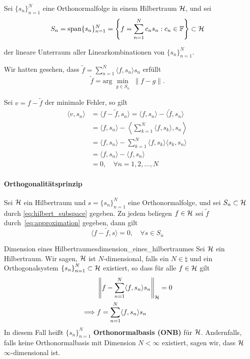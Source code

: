 Sei $\{s_{n}\}_{n=1}^{N}$ eine Orthonormalfolge in einem Hilbertraum $\mathcal{H}$, und sei
\begin{equation}
S_{n} = \mathrm{span}\{s_{n}\}_{n=1}^{N} = \left\{f = \sum\limits_{n=1}^{N} c_{n}s_{n} : c_{n} \in \mathbb{F}\right\} \subset \mathcal{H} \label{eq:hilbert_subspace}
\end{equation}

der lineare Unterraum aller Linearkombinationen von $\{s_{n}\}_{n=1}^{N}$.

Wir hatten gesehen, dass $\tilde{f} = \sum\limits_{n=1}^{N} \langle f, s_{n} \rangle s_{n}$ erfüllt
\begin{equation}
  \tilde{f} = \mathrm{arg}\min_{\substack{g\in S_{n}}} \| f - g \|. \label{eq:approximation}
\end{equation}

Sei $v = f - \tilde{f}$ der minimale Fehler, so gilt
\begin{align*}
  \langle v, s_{n} \rangle &= \langle f - \tilde{f}, s_{n} \rangle =\langle f, s_{n} \rangle - \langle \tilde{f}, s_{n} \rangle\\
  &= \langle f, s_{n} \rangle - \left\langle \sum\limits_{k=1}^{N}\langle f, s_{k} \rangle , s_{n} \right\rangle\\
  &= \langle f, s_{n} \rangle -  \sum\limits_{k=1}^{N}\langle f, s_{k} \rangle  \langle s_{k}, s_{n} \rangle\\
  &= \langle f, s_{n} \rangle - \langle f, s_{n} \rangle\\
  &= 0, \quad \forall n=1,2,\dots,N
\end{align*}

\paragraph{Orthogonalitätsprinzip}
Sei $\mathcal{H}$ ein Hilbertraum und $s = \{s_{n}\}_{n=1}^{N}$ eine Orthonormalfolge, und sei $S_{n} \subset \mathcal{H}$ durch \eqref{eq:hilbert_subspace} gegeben.
Zu jedem beliegen $f \in \mathcal{H}$ sei $\tilde{f}$ durch~\eqref{eq:approximation} gegeben, dann gilt
\begin{equation}
  \langle f - \tilde{f}, s \rangle  = 0, \quad \forall s \in S_{n}
\end{equation}

\begin{boringDef}{Dimension eines Hilbertraumes}{dimension_eines_hilbertraumes}
  Sei $\mathcal{H}$ ein Hilbertraum. Wir sagen, $\mathcal{H}$ ist $N$-dimensional, falls ein $N \in \natural$ und ein Orthogonalsystem ${\{s_{n}\}}_{n=1}^{N} \subset \mathcal{H}$ existiert, so dass für alle $f \in \mathcal{H}$ gilt
  \begin{align}
    &\left\| f - \sum\limits_{n=1}^{N} \langle f, s_{n} \rangle s_{n} \right\|_{\mathcal{H}} = 0\\
    \implies &f = \sum\limits_{n=1}^{N} \langle f, s_{n} \rangle s_{n}
  \end{align}
  In diesem Fall heißt ${\{s_{n}\}}_{n=1}^{N}$ \textbf{Orthonormalbasis (ONB)} für $\mathcal{H}$.
  Andernfalls, falls keine Orthonormalbasis mit Dimension $N<\infty$ existiert, sagen wir, dass $\mathcal{H}$ $\infty$-dimensional ist.
\end{boringDef}

